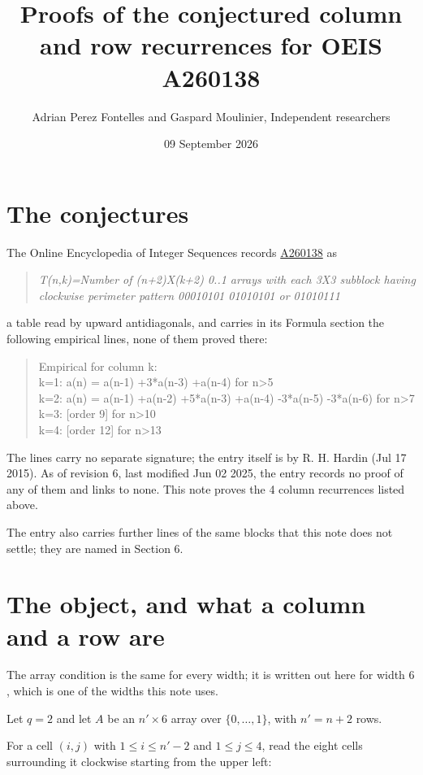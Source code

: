 \documentclass[11pt]{article}
\title{Proofs of the conjectured column and row recurrences for OEIS A260138}
\author{Adrian Perez Fontelles and Gaspard Moulinier, Independent researchers}
\date{09 September 2026}
\theoremstyle{definition}
\begin{document}
\maketitle
\section{The conjectures}

The Online Encyclopedia of Integer Sequences records \href{https://oeis.org/A260138}{A260138} as

\begin{quote}\itshape T(n,k)=Number of (n+2)X(k+2) 0..1 arrays with each 3X3 subblock having clockwise perimeter pattern 00010101 01010101 or 01010111\end{quote}

a table read by upward antidiagonals, and carries in its Formula section the following empirical lines, none of them proved there:

\begin{quote}\ttfamily Empirical for column k:\\
k=1: a(n) = a(n-1) +3*a(n-3) +a(n-4) for n>5\\k=2: a(n) = a(n-1) +a(n-2) +5*a(n-3) +a(n-4) -3*a(n-5) -3*a(n-6) for n>7\\k=3: [order 9] for n>10\\k=4: [order 12] for n>13\end{quote}

The lines carry no separate signature; the entry itself is by R. H. Hardin (Jul 17 2015). As of revision 6, last modified Jun 02 2025, the entry records no proof of any of them and links to none. This note proves the 4 column recurrences listed above.

The entry also carries further lines of the same blocks that this note does not settle; they are named in Section 6.

\section{The object, and what a column and a row are}

The array condition is the same for every width; it is written out here for width $6$, which is one of the widths this note uses.

Let $q = 2$ and let $A$ be an $n' \times 6$ array over $\{0,\dots,1\}$, with $n' = n + 2$ rows.

For a cell $(i,j)$ with $1 \le i \le n'-2$ and $1 \le j \le 4$, read the eight cells surrounding it clockwise starting from the upper left:
\end{document}

